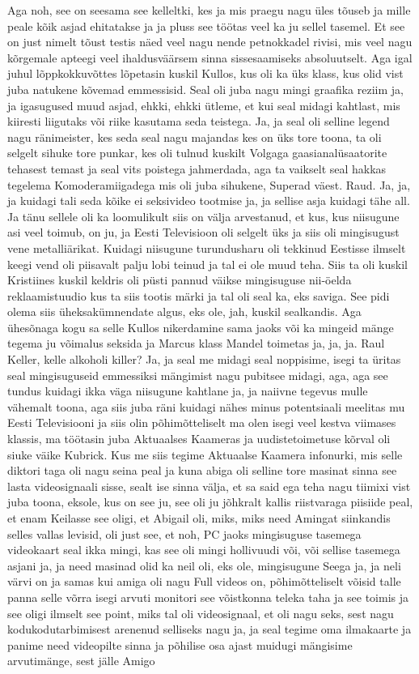 Aga noh, see on seesama see kelleltki, kes ja mis praegu nagu üles tõuseb ja mille peale kõik asjad ehitatakse ja ja pluss see töötas veel ka ju sellel tasemel. Et see on just nimelt tõust testis näed veel nagu nende petnokkadel rivisi, mis veel nagu kõrgemale apteegi veel ihaldusväärsem sinna sissesaamiseks absoluutselt. Aga igal juhul lõppkokkuvõttes lõpetasin kuskil Kullos, kus oli ka üks klass, kus olid vist juba natukene kõvemad emmessisid. Seal oli juba nagu mingi graafika reziim ja, ja igasugused muud asjad, ehkki, ehkki ütleme, et kui seal midagi kahtlast, mis kiiresti liigutaks või riike kasutama seda teistega. Ja, ja seal oli selline legend nagu ränimeister, kes seda seal nagu majandas kes on üks tore toona, ta oli selgelt sihuke tore punkar, kes oli tulnud kuskilt Volgaga gaasianalüsaatorite tehasest temast ja seal vits poistega jahmerdada, aga ta vaikselt seal hakkas tegelema Komoderamiigadega mis oli juba sihukene, Superad väest. Raud. Ja, ja, ja kuidagi tali seda kõike ei seksivideo tootmise ja, ja sellise asja kuidagi tähe all. Ja tänu sellele oli ka loomulikult siis on välja arvestanud, et kus, kus niisugune asi veel toimub, on ju, ja Eesti Televisioon oli selgelt üks ja siis oli mingisugust vene metalliärikat. Kuidagi niisugune turundusharu oli tekkinud Eestisse ilmselt keegi vend oli piisavalt palju lobi teinud ja tal ei ole muud teha. Siis ta oli kuskil Kristiines kuskil keldris oli püsti pannud väikse mingisuguse nii-öelda reklaamistuudio kus ta siis tootis märki ja tal oli seal ka, eks saviga. See pidi olema siis üheksakümnendate algus, eks ole, jah, kuskil sealkandis. Aga ühesõnaga kogu sa selle Kullos nikerdamine sama jaoks või ka mingeid mänge tegema ju võimalus seksida ja Marcus klass Mandel toimetas ja, ja, ja. Raul Keller, kelle alkoholi killer? Ja, ja seal me midagi seal noppisime, isegi ta üritas seal mingisuguseid emmessiksi mängimist nagu pubitsee midagi, aga, aga see tundus kuidagi ikka väga niisugune kahtlane ja, ja naiivne tegevus mulle vähemalt toona, aga siis juba räni kuidagi nähes minus potentsiaali meelitas mu Eesti Televisiooni ja siis olin põhimõtteliselt ma olen isegi veel kestva viimases klassis, ma töötasin juba Aktuaalses Kaameras ja uudistetoimetuse kõrval oli siuke väike Kubrick. Kus me siis tegime Aktuaalse Kaamera infonurki, mis selle diktori taga oli nagu seina peal ja kuna abiga oli selline tore masinat sinna see lasta videosignaali sisse, sealt ise sinna välja, et sa said ega teha nagu tiimixi vist juba toona, eksole, kus on see ju, see oli ju jõhkralt kallis riistvaraga piisiide peal, et enam Keilasse see oligi, et Abigail oli, miks, miks need Amingat siinkandis selles vallas levisid, oli just see, et noh, PC jaoks mingisuguse tasemega videokaart seal ikka mingi, kas see oli mingi hollivuudi või, või sellise tasemega asjani ja, ja need masinad olid ka neil oli, eks ole, mingisugune Seega ja, ja neli värvi on ja samas kui amiga oli nagu Full videos on, põhimõtteliselt võisid talle panna selle võrra isegi arvuti monitori see võistkonna teleka taha ja see toimis ja see oligi ilmselt see point, miks tal oli videosignaal, et oli nagu seks, sest nagu kodukodutarbimisest arenenud selliseks nagu ja, ja seal tegime oma ilmakaarte ja panime need videopilte sinna ja põhilise osa ajast muidugi mängisime arvutimänge, sest jälle Amigo 